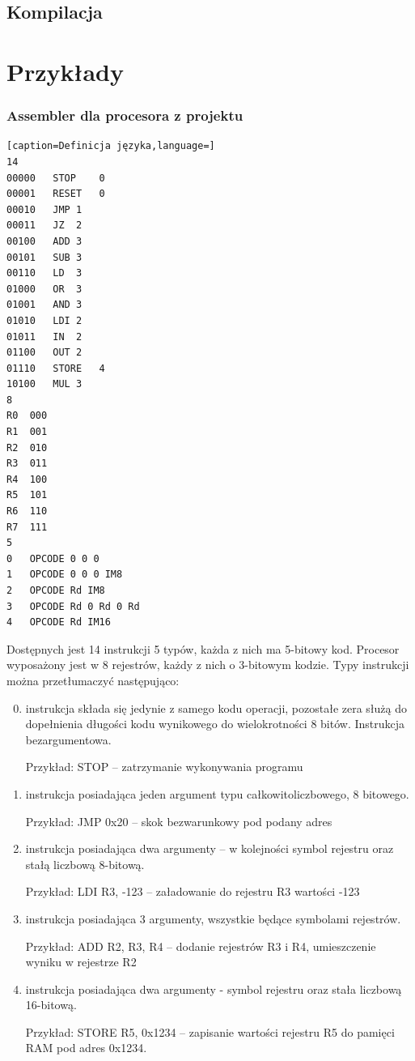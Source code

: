 \documentclass[a4paper,12pt]{report}
\begin{document}
\subsection{Kompilacja}

\section{Przykłady}

\subsubsection{Assembler dla procesora z projektu}
\lstset{
tabsize=6
}
\begin{lstlisting}[caption=Definicja języka,language=]
14
00000	STOP	0
00001	RESET	0
00010	JMP	1
00011	JZ	2
00100	ADD	3
00101	SUB	3
00110	LD	3
01000	OR	3
01001	AND	3
01010	LDI	2
01011	IN	2
01100	OUT	2
01110	STORE	4
10100	MUL	3
8
R0	000
R1	001
R2	010
R3	011
R4	100
R5	101
R6	110
R7	111
5
0	OPCODE 0 0 0
1	OPCODE 0 0 0 IM8
2	OPCODE Rd IM8
3	OPCODE Rd 0 Rd 0 Rd
4	OPCODE Rd IM16
\end{lstlisting}

Dostępnych jest 14 instrukcji 5 typów, każda z nich ma 5-bitowy kod. Procesor wyposażony jest w 8 rejestrów, każdy z nich o 3-bitowym kodzie. Typy instrukcji można przetłumaczyć następująco:
\begin{enumerate}
\setcounter{enumi}{-1}
  \item instrukcja składa się jedynie z samego kodu operacji, pozostałe zera służą do dopełnienia długości kodu wynikowego do wielokrotności 8 bitów. Instrukcja bezargumentowa.

  Przykład: STOP -- zatrzymanie wykonywania programu
  \item instrukcja posiadająca jeden argument typu całkowitoliczbowego, 8 bitowego. 

  Przykład: JMP 0x20 -- skok bezwarunkowy pod podany adres
  \item instrukcja posiadająca dwa argumenty -- w kolejności symbol rejestru oraz stałą liczbową 8-bitową.
  
  Przykład: LDI R3, -123 -- załadowanie do rejestru R3 wartości -123
  \item instrukcja posiadająca 3 argumenty, wszystkie będące symbolami rejestrów.

  Przykład: ADD R2, R3, R4 -- dodanie rejestrów R3 i R4, umieszczenie wyniku w rejestrze R2
  \item instrukcja posiadająca dwa argumenty - symbol rejestru oraz stała liczbową 16-bitową.

  Przykład: STORE R5, 0x1234 -- zapisanie wartości rejestru R5 do pamięci RAM pod adres 0x1234.
\end{enumerate}
\end{document}

